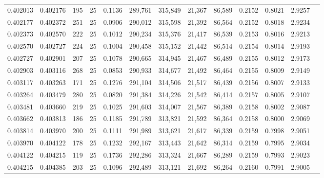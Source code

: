 \begin{tabular}{rrrrrrrrrrrrr}
0.402013 & 0.402176 &   195 &  25 &                                     0.1136 & 289,761 & 315,849 &  21,367 &  86,589 & 0.2152 & 0.8021 & 2.9257 \\
0.402177 & 0.402372 &   251 &  25 &                                     0.0906 & 290,012 & 315,598 &  21,392 &  86,564 & 0.2152 & 0.8018 & 2.9234 \\
0.402373 & 0.402570 &   222 &  25 &                                     0.1012 & 290,234 & 315,376 &  21,417 &  86,539 & 0.2153 & 0.8016 & 2.9213 \\
0.402570 & 0.402727 &   224 &  25 &                                     0.1004 & 290,458 & 315,152 &  21,442 &  86,514 & 0.2154 & 0.8014 & 2.9193 \\
0.402727 & 0.402901 &   207 &  25 &                                     0.1078 & 290,665 & 314,945 &  21,467 &  86,489 & 0.2155 & 0.8012 & 2.9173 \\
0.402903 & 0.403116 &   268 &  25 &                                     0.0853 & 290,933 & 314,677 &  21,492 &  86,464 & 0.2155 & 0.8009 & 2.9149 \\
0.403117 & 0.403263 &   171 &  25 &                                     0.1276 & 291,104 & 314,506 &  21,517 &  86,439 & 0.2156 & 0.8007 & 2.9133 \\
0.403264 & 0.403479 &   280 &  25 &                                     0.0820 & 291,384 & 314,226 &  21,542 &  86,414 & 0.2157 & 0.8005 & 2.9107 \\
0.403481 & 0.403660 &   219 &  25 &                                     0.1025 & 291,603 & 314,007 &  21,567 &  86,389 & 0.2158 & 0.8002 & 2.9087 \\
0.403662 & 0.403813 &   186 &  25 &                                     0.1185 & 291,789 & 313,821 &  21,592 &  86,364 & 0.2158 & 0.8000 & 2.9069 \\
0.403814 & 0.403970 &   200 &  25 &                                     0.1111 & 291,989 & 313,621 &  21,617 &  86,339 & 0.2159 & 0.7998 & 2.9051 \\
0.403970 & 0.404122 &   178 &  25 &                                     0.1232 & 292,167 & 313,443 &  21,642 &  86,314 & 0.2159 & 0.7995 & 2.9034 \\
0.404122 & 0.404215 &   119 &  25 &                                     0.1736 & 292,286 & 313,324 &  21,667 &  86,289 & 0.2159 & 0.7993 & 2.9023 \\
0.404215 & 0.404385 &   203 &  25 &                                     0.1096 & 292,489 & 313,121 &  21,692 &  86,264 & 0.2160 & 0.7991 & 2.9005 \\

\end{tabular}
